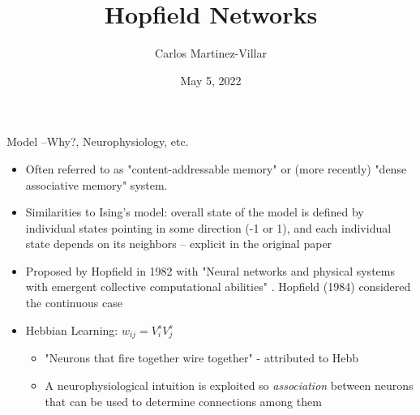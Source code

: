 \documentclass[10pt]{beamer}
\title{Hopfield Networks }
\author[STAT 9100]{Carlos Martinez-Villar}
\date{May 5, 2022}
\begin{document}
\begin{frame}
	\titlepage
\end{frame}

%	

\begin{frame}{Model --Why?, Neurophysiology, etc.}
	\begin{itemize}
		\item Often referred to as "content-addressable memory" or (more recently) "dense associative memory" system. 
		\item Similarities to Ising's model: overall state of the model is defined by individual states pointing in some direction (-1 or 1), and each individual state depends on its neighbors -- explicit in the original paper
		\item Proposed by Hopfield in 1982 with  "Neural networks and physical systems with emergent collective computational abilities" \cite{hopfield1982neural}. Hopfield (1984) \cite{hopfield1984neurons} considered the continuous case 
		\item Hebbian Learning:  $w_{ij} =  V^s_i V^s_j$
			\begin{itemize}
				\item "Neurons that fire together wire together" - attributed to Hebb \cite{hebb2005organization}
				\item A neurophysiological intuition is exploited so \emph{association} between neurons that can be used to determine connections among them
			\end{itemize}		
	\end{itemize}
\end{frame}
\end{document}
